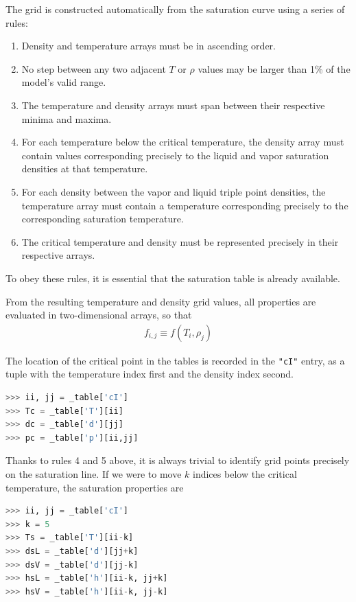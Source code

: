 The grid is constructed automatically from the saturation curve using a series of rules:
\begin{enumerate}
\item Density and temperature arrays must be in ascending order.
\item No step between any two adjacent $T$ or $\rho$ values may be larger than 1\% of the model's valid range.
\item The temperature and density arrays must span between their respective minima and maxima.
\item For each temperature below the critical temperature, the density array must contain values corresponding precisely to the liquid and vapor saturation densities at that temperature.
\item For each density between the vapor and liquid triple point densities, the temperature array must contain a temperature corresponding precisely to the corresponding saturation temperature.
\item The critical temperature and density must be represented precisely in their respective arrays.
\end{enumerate}
To obey these rules, it is essential that the saturation table is already available.

From the resulting temperature and density grid values, all properties are evaluated in two-dimensional arrays, so that
\begin{align}
f_{i,j} \equiv f(T_i, \rho_j)
\end{align}

The location of the critical point in the tables is recorded in the \texttt{"cI"} entry, as a tuple with the temperature index first and the density index second.
\begin{lstlisting}[language=Python]
>>> ii, jj = _table['cI']
>>> Tc = _table['T'][ii]
>>> dc = _table['d'][jj]
>>> pc = _table['p'][ii,jj]
\end{lstlisting}
Thanks to rules 4 and 5 above, it is always trivial to identify grid points precisely on the saturation line.  If we were to move $k$ indices below the critical temperature, the saturation properties are
\begin{lstlisting}[language=Python]
>>> ii, jj = _table['cI']
>>> k = 5
>>> Ts = _table['T'][ii-k]
>>> dsL = _table['d'][jj+k]
>>> dsV = _table['d'][jj-k]
>>> hsL = _table['h'][ii-k, jj+k]
>>> hsV = _table['h'][ii-k, jj-k]
\end{lstlisting}

